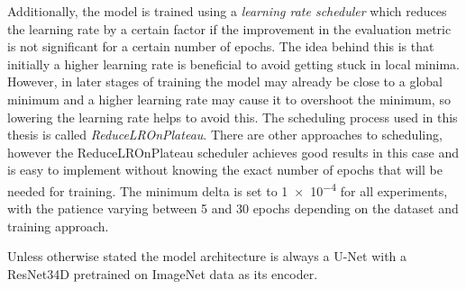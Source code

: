 Additionally, the model is trained using a \emph{learning rate scheduler} which reduces the learning rate by a certain factor if the improvement in the evaluation metric is not significant for a certain number of epochs. The idea behind this is that initially a higher learning rate is beneficial to avoid getting stuck in local minima. However, in later stages of training the model may already be close to a global minimum and a higher learning rate may cause it to overshoot the minimum, so lowering the learning rate helps to avoid this. The scheduling process used in this thesis is called \emph{ReduceLROnPlateau}\cite{ReduceLROnPlateauPyTorch13}. There are other approaches to scheduling, however the ReduceLROnPlateau scheduler achieves good results in this case and is easy to implement without knowing the exact number of epochs that will be needed for training. The minimum delta is set to \num{1e-4} for all experiments, with the patience varying between 5 and 30 epochs depending on the dataset and training approach.

Unless otherwise stated the model architecture is always a U-Net with a ResNet34D pretrained on ImageNet data as its encoder.